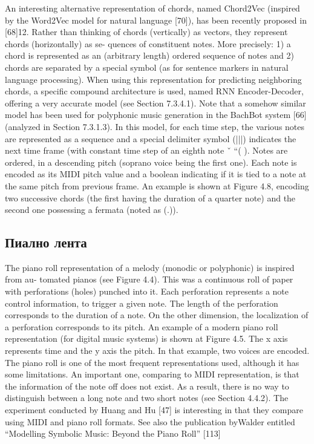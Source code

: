 An interesting alternative representation of chords, named Chord2Vec (inspired by the
Word2Vec model for natural language [70]), has been recently proposed in [68]12. Rather than thinking of chords (vertically) as vectors, they represent chords (horizontally) as se- quences of constituent notes. More precisely: 1) a chord is represented as an (arbitrary length) ordered sequence of notes and 2) chords are separated by a special symbol (as for sentence markers in natural language processing). When using this representation for predicting neighboring chords, a specific compound architecture is used, named RNN Encoder-Decoder, offering a very accurate model (see Section 7.3.4.1). Note that a somehow similar model has been used for polyphonic music generation in
the BachBot system [66] (analyzed in Section 7.3.1.3). In this model, for each time step, the various notes are represented as a sequence and a special delimiter symbol (|||) indicates
the next time frame (with constant time step of an eighth note ˇ “( ). Notes are ordered, in a descending pitch (soprano voice being the first one). Each note is encoded as its MIDI pitch
value and a boolean indicating if it is tied to a note at the same pitch from previous frame. An example is shown at Figure 4.8, encoding two successive chords (the first having the duration of a quarter note) and the second one possessing a fermata (noted as (.)).

\subsection{Пиално лента}

The piano roll representation of a melody (monodic or polyphonic) is inspired from au- tomated pianos (see Figure 4.4). This was a continuous roll of paper with perforations (holes) punched into it. Each perforation represents a note control information, to trigger a given note. The length of the perforation corresponds to the duration of a note. On the other dimension, the localization of a perforation corresponds to its pitch. An example of a modern piano roll representation (for digital music systems) is shown
at Figure 4.5. The x axis represents time and the y axis the pitch. In that example, two voices are encoded. The piano roll is one of the most frequent representations used, although it has some limitations. An important one, comparing to MIDI representation, is that the information of the note off does not exist. As a result, there is no way to distinguish between a long note and two short notes (see Section 4.4.2). The experiment conducted by Huang and Hu [47] is interesting in that they compare using MIDI and piano roll formats. See also the publication byWalder entitled “Modelling Symbolic Music: Beyond the Piano Roll” [113]


